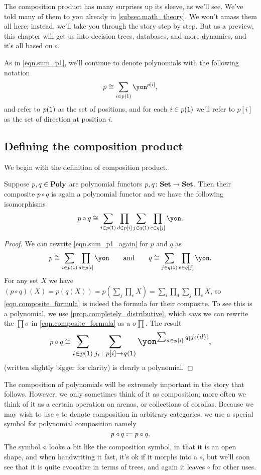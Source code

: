 \documentclass[DynamicalBook]{subfiles}
\begin{document}
The composition product has many surprises up its sleeve, as we'll see. We've told many of them to you already in \cref{subsec.math_theory}. We won't amass them all here; instead, we'll take you through the story step by step. But as a preview, this chapter will get us into decision trees, databases, and more dynamics, and it's all based on $\circ$.

As in \cref{eqn.sum_p1}, we'll continue to denote polynomials with the following notation
\begin{equation}\label{eqn.sum_p1_again}
p\cong\sum_{i\in p(\1)}\yon^{p[i]},
\end{equation}
and refer to $p(\textsf{1})$ as the set of positions, and for each $i\in p(\textsf{1})$ we'll refer to $p[i]$ as the set of direction at position $i$.

\subsection{Defining the composition product}
We begin with the definition of composition product.

\begin{proposition}\label{prop.poly_closed_comp}
Suppose $p,q\in\textbf{Poly}$ are polynomial functors $p,q\colon\textbf{Set}\to\textbf{Set}$. Then their composite $p\circ q$ is again a polynomial functor and we have the following isomorphisms
\[
p\circ q\cong\sum_{i\in p(\1)}\prod_{d\in p[i]}\sum_{j\in q(\1)}\prod_{e\in q[j]}\yon.
\]
\end{proposition}
\begin{proof}
We can rewrite \cref{eqn.sum_p1_again} for $p$ and $q$ as
\[
p\cong\sum_{i\in p(\1)}\prod_{d\in p[i]}\yon
\qqand
q\cong\sum_{j\in q(\1)}\prod_{e\in q[j]}\yon.
\]
For any set $X$ we have $(p\circ q)(X)=p(q(X))=p(\sum_j\prod_e X)=\sum_i\prod_d\sum_j\prod_eX$, so \eqref{eqn.composite_formula} is indeed the formula for their composite. To see this is a polynomial, we use \cref{prop.completely_distributive}, which says we can rewrite the $\prod\sigma$ in \eqref{eqn.composite_formula} as a $\sigma\prod$. The result 
\begin{equation}\label{eqn.composition_formula_sums_first}
  p\circ q\cong
  \scalebox{1.3}{$\displaystyle
  \sum_{i\in p(\1)}\sum_{j_i\colon p[i]\to q(\1)}\yon^{\sum_{d\in p[i]}q_[j_i(d)]},$}
\end{equation}
(written slightly bigger for clarity) is clearly a polynomial.
\end{proof}

The composition of polynomials will be extremely important in the story that follows. However, we only sometimes think of it as composition; more often we think of it as a certain operation on arenas, or collections of corollas. Because we may wish to use $\circ$ to denote composition in arbitrary categories, we use a special symbol for polynomial composition namely
\[
p\mathbin{\triangleleft} q\coloneqq p\circ q.
\]
The symbol $\mathbin{\triangleleft}$ looks a bit like the composition symbol, in that it is an open shape, and when handwriting it fast, it's ok if it morphs into a $\circ$, but we'll soon see that it is quite evocative in terms of trees, and again it leaves $\circ$ for other uses.
\end{document}
